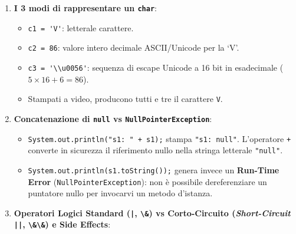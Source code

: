 \documentclass[11pt,a4paper,oneside]{report}
\newcommand{\passthrough}[1]{#1}
\providecommand{\tightlist}{\setlength{\itemsep}{0pt}\setlength{\parskip}{0pt}}
\begin{document}
\begin{enumerate}
  \begin{itemize}
  \tightlist
  \item
    \passthrough{\lstinline!static final double PI = 3.14;!}: la keyword
    \passthrough{\lstinline!final!} rende la variabile a sola lettura
    dopo l'inizializzazione. Il tentativo di riassegnamento
    \passthrough{\lstinline!PI = 3.0;!} viene respinto dal compilatore
    (\passthrough{\lstinline!cannot assign a value to final variable PI!}).
    Per convenzione Java, le costanti
    \passthrough{\lstinline!static final!} si scrivono in
    \passthrough{\lstinline!MAIUSCOLO\_SNAKE\_CASE!}.
  \end{itemize}
\item
  \textbf{I 3 modi di rappresentare un \passthrough{\lstinline!char!}}:

  \begin{itemize}
  \tightlist
  \item
    \passthrough{\lstinline!c1 = 'V'!}: letterale carattere.
  \item
    \passthrough{\lstinline!c2 = 86!}: valore intero decimale
    ASCII/Unicode per la `V'.
  \item
    \passthrough{\lstinline!c3 = '\\u0056'!}: sequenza di escape Unicode
    a 16 bit in esadecimale (\(5 \times 16 + 6 = 86\)).
  \item
    Stampati a video, producono tutti e tre il carattere
    \passthrough{\lstinline!V!}.
  \end{itemize}
\item
  \textbf{Concatenazione di \passthrough{\lstinline!null!} vs
  \passthrough{\lstinline!NullPointerException!}}:

  \begin{itemize}
  \tightlist
  \item
    \passthrough{\lstinline!System.out.println("s1: " + s1);!} stampa
    \passthrough{\lstinline!"s1: null"!}. L'operatore
    \passthrough{\lstinline!+!} converte in sicurezza il riferimento
    nullo nella stringa letterale \passthrough{\lstinline!"null"!}.
  \item
    \passthrough{\lstinline!System.out.println(s1.toString());!} genera
    invece un \textbf{Run-Time Error}
    (\passthrough{\lstinline!NullPointerException!}): non è possibile
    dereferenziare un puntatore nullo per invocarvi un metodo d'istanza.
  \end{itemize}
\item
  \textbf{Operatori Logici Standard (\passthrough{\lstinline!|!},
  \passthrough{\lstinline!\&!}) vs Corto-Circuito (\emph{Short-Circuit}
  \passthrough{\lstinline!||!}, \passthrough{\lstinline!\&\&!}) e Side
  Effects}:


\end{enumerate}
\end{document}

